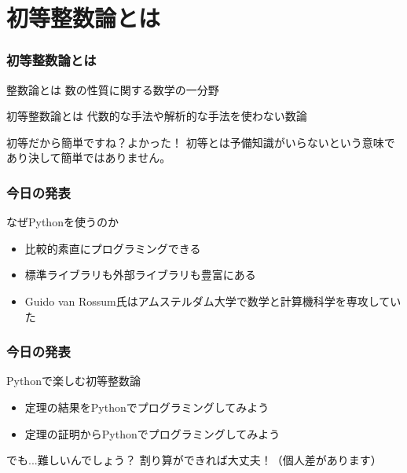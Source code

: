 \documentclass[dvipdfmx,11pt,notheorems]{beamer}
\theoremstyle{definition}
\begin{document}
\section{初等整数論とは}

\begin{frame}\frametitle{初等整数論とは}

\begin{block}{整数論とは}
数の性質に関する数学の一分野
\end{block}

\begin{block}{初等整数論とは}
代数的な手法や解析的な手法を使わない数論
\end{block}

\begin{alertblock}{初等だから簡単ですね？よかった！}
初等とは予備知識がいらないという意味であり決して簡単ではありません。
\end{alertblock}

\end{frame}

\begin{frame}\frametitle{今日の発表}

\begin{block}{なぜPythonを使うのか}
\begin{itemize}
\item 比較的素直にプログラミングできる
\item 標準ライブラリも外部ライブラリも豊富にある
\item Guido van Rossum氏はアムステルダム大学で数学と計算機科学を専攻していた
\end{itemize}
\end{block}

\end{frame}

\begin{frame}\frametitle{今日の発表}

\begin{block}{Pythonで楽しむ初等整数論}
\begin{itemize}
\item 定理の結果をPythonでプログラミングしてみよう
\item 定理の証明からPythonでプログラミングしてみよう
\end{itemize}
\end{block}

\begin{exampleblock}{でも...難しいんでしょう？}
割り算ができれば大丈夫！（個人差があります）
\end{exampleblock}

\end{frame}
\end{document}

